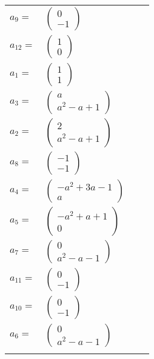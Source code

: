 \documentclass[1p]{elsarticle_modified}
\theoremstyle{definition}
\begin{document}
\begin{tabular}{m{7pt} m{180pt} m{7pt} m{180pt} }
\flushright $a_{9}=$&$\begin{pmatrix}0\\-1\end{pmatrix}$ \\
\flushright $a_{12}=$&$\begin{pmatrix}1\\0\end{pmatrix}$ \\
\flushright $a_{1}=$&$\begin{pmatrix}1\\1\end{pmatrix}$ \\
\flushright $a_{3}=$&$\begin{pmatrix}a\\a^2- a+1\end{pmatrix}$ \\
\flushright $a_{2}=$&$\begin{pmatrix}2\\a^2- a+1\end{pmatrix}$ \\
\flushright $a_{8}=$&$\begin{pmatrix}-1\\-1\end{pmatrix}$ \\
\flushright $a_{4}=$&$\begin{pmatrix}- a^2+3 a-1\\a\end{pmatrix}$ \\
\flushright $a_{5}=$&$\begin{pmatrix}- a^2+a+1\\0\end{pmatrix}$ \\
\flushright $a_{7}=$&$\begin{pmatrix}0\\a^2- a-1\end{pmatrix}$ \\
\flushright $a_{11}=$&$\begin{pmatrix}0\\-1\end{pmatrix}$ \\
\flushright $a_{10}=$&$\begin{pmatrix}0\\-1\end{pmatrix}$ \\
\flushright $a_{6}=$&$\begin{pmatrix}0\\a^2- a-1\end{pmatrix}$\\&\end{tabular}
\end{document}
